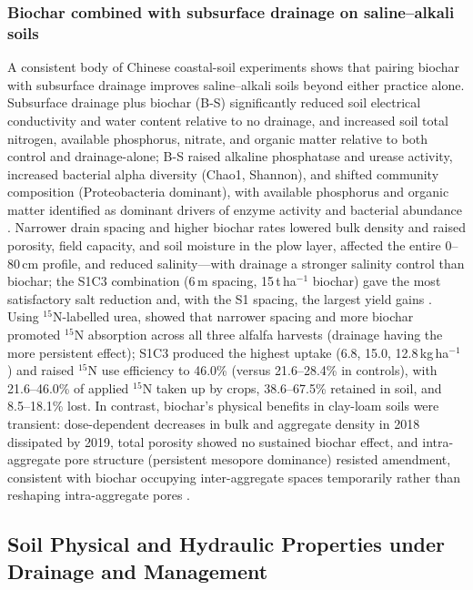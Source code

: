 \subsubsection{Biochar combined with subsurface drainage on saline--alkali soils}
A consistent body of Chinese coastal-soil experiments shows that pairing biochar with subsurface drainage improves saline--alkali soils beyond either practice alone. Subsurface drainage plus biochar (B-S) significantly reduced soil electrical conductivity and water content relative to no drainage, and increased soil total nitrogen, available phosphorus, nitrate, and organic matter relative to both control and drainage-alone; B-S raised alkaline phosphatase and urease activity, increased bacterial alpha diversity (Chao1, Shannon), and shifted community composition (Proteobacteria dominant), with available phosphorus and organic matter identified as dominant drivers of enzyme activity and bacterial abundance \parencite{Tian2023b}. Narrower drain spacing and higher biochar rates lowered bulk density and raised porosity, field capacity, and soil moisture in the plow layer, affected the entire 0--80\,cm profile, and reduced salinity---with drainage a stronger salinity control than biochar; the S1C3 combination (6\,m spacing, 15\,t\,ha$^{-1}$ biochar) gave the most satisfactory salt reduction and, with the S1 spacing, the largest yield gains \parencite{Liu2025f}. Using $^{15}$N-labelled urea, \textcite{Xiong2025} showed that narrower spacing and more biochar promoted $^{15}$N absorption across all three alfalfa harvests (drainage having the more persistent effect); S1C3 produced the highest uptake (6.8, 15.0, 12.8\,kg\,ha$^{-1}$) and raised $^{15}$N use efficiency to 46.0\% (versus 21.6--28.4\% in controls), with 21.6--46.0\% of applied $^{15}$N taken up by crops, 38.6--67.5\% retained in soil, and 8.5--18.1\% lost. In contrast, biochar's physical benefits in clay-loam soils were transient: dose-dependent decreases in bulk and aggregate density in 2018 dissipated by 2019, total porosity showed no sustained biochar effect, and intra-aggregate pore structure (persistent mesopore dominance) resisted amendment, consistent with biochar occupying inter-aggregate spaces temporarily rather than reshaping intra-aggregate pores \parencite{Brikmans2025}.

\subsection{Soil Physical and Hydraulic Properties under Drainage and Management}

